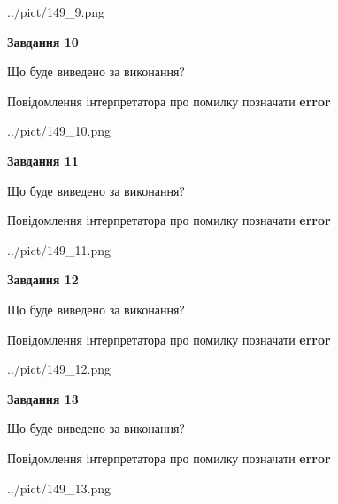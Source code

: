 \documentclass[11pt, ukrainian]{article}
\begin{document}
{\begin {large}
\begin{center}
	{../pict/149_9.png}
\end{center}
\newpage

{\begin {center}\textbf{Завдання 10}\end {center}}\par
Що буде виведено за виконання? \par
Повідомлення інтерпретатора про помилку позначати \textbf{error}

\begin{center}
	{../pict/149_10.png}
\end{center}
\newpage

{\begin {center}\textbf{Завдання 11}\end {center}}\par
Що буде виведено за виконання? \par
Повідомлення інтерпретатора про помилку позначати \textbf{error}

\begin{center}
	{../pict/149_11.png}
\end{center}
\newpage

{\begin {center}\textbf{Завдання 12}\end {center}}\par
Що буде виведено за виконання? \par
Повідомлення інтерпретатора про помилку позначати \textbf{error}

\begin{center}
	{../pict/149_12.png}
\end{center}
\newpage

{\begin {center}\textbf{Завдання 13}\end {center}}\par
Що буде виведено за виконання? \par
Повідомлення інтерпретатора про помилку позначати \textbf{error}

\begin{center}
	{../pict/149_13.png}
\end{center}
\newpage


\end{large}}
\end{document}
